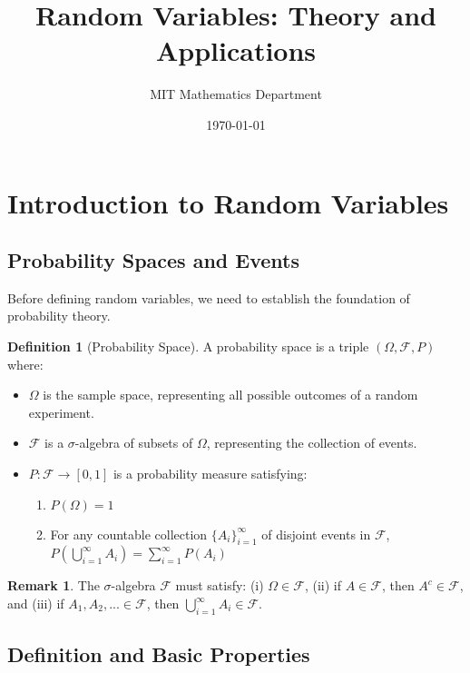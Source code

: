 \documentclass[12pt,a4paper]{article}
\title{Random Variables: Theory and Applications}
\author{MIT Mathematics Department}
\date{\today}
\theoremstyle{plain}
\theoremstyle{definition}
\newtheorem{definition}[theorem]{Definition}
\newtheorem{remark}[theorem]{Remark}
\begin{document}
\maketitle
\tableofcontents
\newpage

\section{Introduction to Random Variables}

\subsection{Probability Spaces and Events}

Before defining random variables, we need to establish the foundation of probability theory.

\begin{definition}[Probability Space]
A probability space is a triple $(\Omega, \mathcal{F}, P)$ where:
\begin{itemize}
\item $\Omega$ is the sample space, representing all possible outcomes of a random experiment.
\item $\mathcal{F}$ is a $\sigma$-algebra of subsets of $\Omega$, representing the collection of events.
\item $P: \mathcal{F} \rightarrow [0,1]$ is a probability measure satisfying:
  \begin{enumerate}[label=(\roman*)]
  \item $P(\Omega) = 1$
  \item For any countable collection $\{A_i\}_{i=1}^{\infty}$ of disjoint events in $\mathcal{F}$, $P\left(\bigcup_{i=1}^{\infty} A_i\right) = \sum_{i=1}^{\infty} P(A_i)$
  \end{enumerate}
\end{itemize}
\end{definition}

\begin{remark}
The $\sigma$-algebra $\mathcal{F}$ must satisfy: (i) $\Omega \in \mathcal{F}$, (ii) if $A \in \mathcal{F}$, then $A^c \in \mathcal{F}$, and (iii) if $A_1, A_2, ... \in \mathcal{F}$, then $\bigcup_{i=1}^{\infty} A_i \in \mathcal{F}$.
\end{remark}

\subsection{Definition and Basic Properties}
\end{document}
